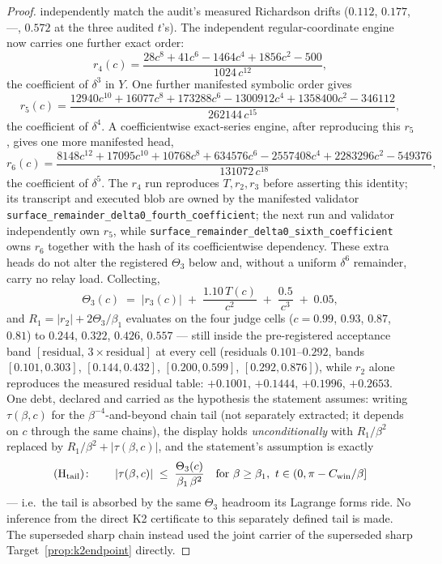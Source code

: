 \documentclass[11pt]{article}
\theoremstyle{remark}
\begin{document}
\begin{proof}
independently match the audit's measured Richardson drifts
\textup{(}$0.112$, $0.177$, ---, $0.572$ at the three audited
$t$'s\textup{)}.  The independent regular-coordinate engine now carries
one further exact order:
\[
r_4(c)=\frac{28c^8+41c^6-1464c^4+1856c^2-500}{1024\,c^{12}},
\]
the coefficient of $\delta^3$ in $Y$.  One further manifested symbolic
order gives
\[
r_5(c)=\frac{12940c^{10}+16077c^8+173288c^6-1300912c^4
+1358400c^2-346112}{262144\,c^{15}},
\]
the coefficient of $\delta^4$.  A coefficientwise exact-series engine,
after reproducing this $r_5$, gives one more manifested head,
\[
r_6(c)=\frac{8148c^{12}+17095c^{10}+10768c^8+634576c^6
-2557408c^4+2283296c^2-549376}{131072\,c^{18}},
\]
the coefficient of $\delta^5$.  The $r_4$ run reproduces
$T,r_2,r_3$ before asserting this identity; its transcript and executed
blob are owned by the manifested validator
\nolinkurl{surface_remainder_delta0_fourth_coefficient}; the next run and
validator independently own $r_5$, while
\nolinkurl{surface_remainder_delta0_sixth_coefficient} owns $r_6$ together
with the hash of its coefficientwise dependency.  These extra heads do not
alter the registered $\Theta_3$ below and, without a uniform $\delta^6$ remainder,
carry no relay load.  Collecting,
\[
\Theta_3(c)\;=\;|r_3(c)|\;+\;\frac{1.10\,T(c)}{c^2}
\;+\;\frac{0.5}{c^3}\;+\;0.05 ,
\]
and $R_1=|r_2|+2\Theta_3/\beta_1$ evaluates on the four judge
cells \textup{(}$c=0.99$, $0.93$, $0.87$, $0.81$\textup{)} to
$0.244$, $0.322$, $0.426$, $0.557$ --- still inside the
pre-registered acceptance band
$[\text{residual},\,3\times\text{residual}]$ at every cell
\textup{(}residuals $0.101$--$0.292$, bands
$[0.101,0.303]$, $[0.144,0.432]$, $[0.200,0.599]$,
$[0.292,0.876]$\textup{)}, while $r_2$ alone
reproduces the measured residual table: $+0.1001$, $+0.1444$,
$+0.1996$, $+0.2653$. One debt, declared and carried as the
hypothesis the statement assumes: writing $\tau(\beta,c)$ for the
$\beta^{-4}$-and-beyond chain tail \textup{(}not separately
extracted; it depends on $c$ through the same chains\textup{)},
the display holds \emph{unconditionally} with $R_1/\beta^2$
replaced by $R_1/\beta^2+|\tau(\beta,c)|$, and the statement's
assumption is exactly
\[
(\mathrm H_{\rm tail})\colon\qquad
|\tau(\beta,c)|\;\le\;\frac{\Theta_3(c)}{\beta_1\,\beta^{2}}
\quad\text{for }\beta\ge\beta_1,\ t\in(0,\pi-C_{\rm win}/\beta]
\]
--- i.e.\ the tail is absorbed by the same $\Theta_3$ headroom its
Lagrange forms ride.  No inference from the direct K2 certificate to this
separately defined tail is made.  The superseded sharp chain instead
used the joint carrier of the superseded sharp
Target~\ref{prop:k2endpoint} directly.


\end{proof}
\end{document}
